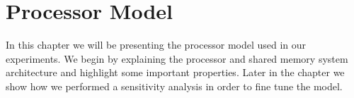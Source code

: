 
\chapter{Processor Model}
\label{cpt:processor_model}

In this chapter we will be presenting the processor model used in our experiments.
We begin by explaining the processor and shared memory system architecture and highlight some important properties.
Later in the chapter we show how we performed a sensitivity analysis in order to fine tune the model.


